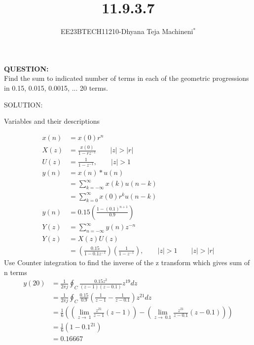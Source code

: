 \documentclass[journal,12pt,twocolumn]{IEEEtran}
\theoremstyle{remark}
\begin{document}

\vspace{3cm}
\title{\textbf{11.9.3.7}}
\author{EE23BTECH11210-Dhyana Teja Machineni$^{*}$%
}
\maketitle
\newpage
\bigskip

\textbf{QUESTION:}\\
Find the sum to indicated number of terms in each of the geometric progressions in
0.15, 0.015, 0.0015, ... 20 terms.


SOLUTION:
\begin{flushleft}
     \begin{table}[h]
         \caption{Variables and their descriptions}
         \label{tab:table2}
         
     \end{table}
 \end{flushleft}
\begin{align}
x(n) &= x(0)r^n \\
X(z) &= \frac{x(0)}{1-rz^{-1}} \qquad |z| > |r| \\
U(z)&=\frac{1}{1-z^{-1}}, \qquad |z|>1\\
y(n)&= x(n)*u(n)\\
&= \sum_{k=- \infty}^{\infty} x(k)u(n-k)\\
&= \sum_{k=0}^{\infty} x(0) r^k u(n-k)\\
y(n)&= 0.15 \left(\frac{1- (0.1)^{n+1}}{0.9}\right)\\
Y(z)&=\sum_{n=-\infty}^{\infty}y(n) z^{-n}\\
Y(z)&=X(z)U(z)\\
&= \left( \frac{0.15}{1-0.1z^{-1}}\right)\left(\frac{1}{1-z^{-1}} \right),\qquad |z| > 1  \qquad |z|>|r|
\end{align}
Use Counter integration to find the inverse of the z transform which gives sum of n terms
\begin{align}
y(20)&=\frac{1}{2\pi j}\oint_C \frac{0.15 z^2}{(z-1)(z-0.1)}z^{19} dz\\
&=\frac{1}{2 \pi j}\oint_C \frac{0.15}{0.9} \left(\frac{1}{z-1} - \frac{1}{z-0.1} \right)z^{21}dz\\
&= \frac{1}{6} \left(\left(\lim_{z\to \ 1}\frac{z^{21}}{z-1} (z-1) \right)-\left(\lim_{z \to \ 0.1}\frac{z^{21}}{z-0.1} (z-0.1)\right)\right)\\
&= \frac{1}{6}(1- 0.1^{21})\\
    &=0.16667
\end{align}
\end{document}
